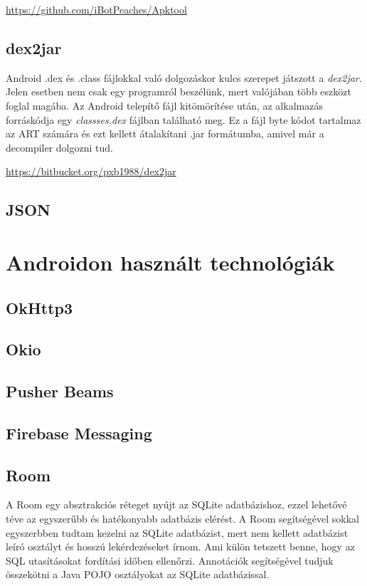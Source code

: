 \documentclass{thesis-ekf}
\theoremstyle{definition}
\theoremstyle{remark}
\begin{document}
\url{https://github.com/iBotPeaches/Apktool}

\subsection{dex2jar}

Android .dex és .class fájlokkal való dolgozáskor kulcs szerepet játszott a \emph{dex2jar}. Jelen esetben nem csak egy programról beszélünk, mert valójában több eszközt foglal magába.
Az Android telepítő fájl kitömörítése után, az alkalmazás forráskódja egy \emph{classses.dex} fájlban található meg.
Ez a fájl byte kódot tartalmaz az ART számára és ezt kellett átalakítani .jar formátumba, amivel már a decompiler dolgozni tud.

\url{https://bitbucket.org/pxb1988/dex2jar}

\subsection{JSON}


\section{Androidon használt technológiák}

\subsection{OkHttp3}

\subsection{Okio}

\subsection{Pusher Beams}



\subsection{Firebase Messaging}

\subsection{Room}

A Room egy absztrakciós réteget nyújt az SQLite adatbázishoz, ezzel lehetővé téve az egyszerűbb és hatékonyabb adatbázis elérést.
A Room segítségével sokkal egyszerbben tudtam kezelni az SQLite adatbázist, mert nem kellett adatbázist leíró osztályt és hosszú lekérdezéseket írnom.
Ami külön tetszett benne, hogy az SQL utasításokat fordítási időben ellenőrzi.
Annotációk segítségével tudjuk összekötni a Java POJO osztályokat az SQLite adatbázissal.
\end{document}
